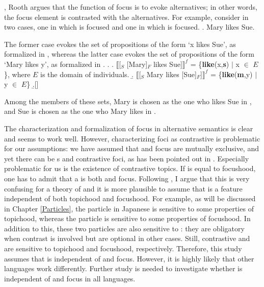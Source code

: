 ,
Rooth argues that the function of focus is to evoke alternatives;
in other words,
the focus element is contrasted with the alternatives.
For example, consider \Next in two cases, one 
in which  is focused and one in which  is focused.
%
\ex. Mary likes Sue.

The former case evokes the set of propositions of the form `x likes Sue',
as formalized in \Next[a],
whereas the latter case evokes the set of propositions of the form `Mary likes y', as formalized in \Next[b].
%
\ex.
  \a. $\llbracket$[$_{S}$ [Mary]$_{F}$ likes Sue]$\rrbracket^{f}$ = \{\textbf{like}(x,\textbf{s}) $\mid$ x $\in$ $E$\}, where $E$ is the domain of individuals.
  \b. $\llbracket$[$_{S}$ Mary likes [Sue]$_{F}$]$\rrbracket^{f}$ = \{\textbf{like}(\textbf{m},y) $\mid$ y $\in$ $E$\}
  \b.[] \hfill{\cite[76]{rooth92}}

Among the members of these sets,
Mary is chosen as the one who likes Sue in \Last[a],
and Sue is chosen as the one who Mary likes in \Last[b].

The characterization and formalization of focus in alternative semantics is
clear and seems to work well.
However, characterizing foci as contrastive is problematic
for our assumptions:
we have assumed that  and focus are mutually exclusive, and yet there can be s and contrastive foci,
as has been pointed out in .
Especially problematic for us is the existence of contrastive topics.
If  is equal to focushood,
one has to admit that a  is both  and focus.
Following ,
I argue that this is very confusing for a theory of  and
it is more plausible to assume that  is a feature independent of both topichood and focushood.
For example,
as will be discussed in Chapter \ref{Particles},
the particle  in Japanese is sensitive to some properties of topichood,
whereas the particle  is sensitive to some properties of focushood.
In addition to this,
these two particles are also sensitive to :
they are obligatory when contrast is involved but are optional in other cases.
Still, contrastive  and  are sensitive to topichood and focushood, respectively.
Therefore, this study
assumes that
 is independent of  and focus.
However, it is highly likely that other languages work differently.
Further study is needed to investigate whether  is independent of  and focus in all languages.

